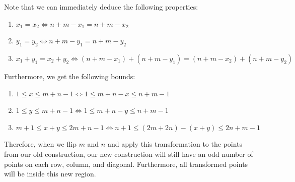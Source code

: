 \documentclass[10pt]{../usamts}
\begin{document}
\begin{solution}
Note that we can immediately deduce the following properties:

\begin{enumerate}
    \item $x_1 = x_2 \iff n+m-x_1 = n+m-x_2$
    \item $y_1 = y_2 \iff n+m-y_1 = n+m-y_2$
    \item $x_1 + y_1 = x_2 + y_2 \iff (n+m-x_1) + (n+m-y_1) = (n+m-x_2) + (n+m-y_2)$
\end{enumerate}

Furthermore, we get the following bounds:

\begin{enumerate}
    \item $1 \le x \le m+n-1 \iff 1 \le m+n-x \le n+m-1$
    \item $1 \le y \le m+n-1 \iff 1 \le m+n-y \le n+m-1$
    \item $m+1 \le x+y \le 2m+n-1 \iff n+1 \le (2m+2n) - (x+y) \le 2n+m-1$
\end{enumerate}

Therefore, when we flip $m$ and $n$ and apply this transformation to the points from our old construction, our new construction will still have an odd number of points on each row, column, and diagonal. Furthermore, all transformed points will be inside this new region.


\end{solution}
\end{document}
